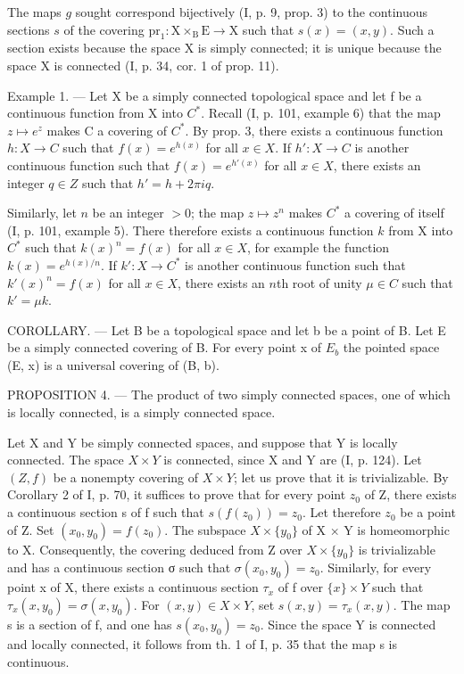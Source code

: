 The maps \(g\) sought correspond bijectively (I, p. 9, prop. 3) to the continuous sections \(s\) of the covering \(\mathrm{pr}_1: \mathrm{X} \times_{\mathrm{B}} \mathrm{E} \to \mathrm{X}\) such that \(s(x) = (x, y)\). Such a section exists because the space X is simply connected; it is unique because the space X is connected (I, p. 34, cor. 1 of prop. 11).

Example 1. --- Let X be a simply connected topological space and let f be a continuous function from X into \(C^{*}\). Recall (I, p. 101, example 6) that the map \(z \mapsto e^{z}\) makes C a covering of \(C^{*}\). By prop. 3, there exists a continuous function \(h: X \to C\) such that \(f(x) = e^{h(x)}\) for all \(x \in X\). If \(h': X \to C\) is another continuous function such that \(f(x) = e^{h'(x)}\) for all \(x \in X\), there exists an integer \(q \in Z\) such that \(h' = h + 2\pi iq\).

Similarly, let \(n\) be an integer \(>0\); the map \(z \mapsto z^{n}\) makes \(C^{*}\) a covering of itself (I, p. 101, example 5). There therefore exists a continuous function \(k\) from X into \(C^{*}\) such that \(k(x)^{n} = f(x)\) for all \(x \in X\), for example the function \(k(x) = e^{h(x)/n}\). If \(k' : X \to C^{*}\) is another continuous function such that \(k'(x)^{n} = f(x)\) for all \(x \in X\), there exists an \(n\)th root of unity \(\mu \in C\) such that \(k' = \mu k\).

COROLLARY. — Let B be a topological space and let b be a point of B. Let E be a simply connected covering of B. For every point x of \(E_{b}\) the pointed space (E, x) is a universal covering of (B, b).

PROPOSITION 4. --- The product of two simply connected spaces, one of which is locally connected, is a simply connected space.

Let X and Y be simply connected spaces, and suppose that Y is locally connected. The space \(X \times Y\) is connected, since X and Y are (I, p. 124). Let \((Z, f)\) be a nonempty covering of \(X \times Y\); let us prove that it is trivializable. By Corollary 2 of I, p. 70, it suffices to prove that for every point \(z_{0}\) of Z, there exists a continuous section s of f such that \(s(f(z_{0})) = z_{0}\). Let therefore \(z_{0}\) be a point of Z. Set \((x_{0}, y_{0}) = f(z_{0})\). The subspace \(X \times \{y_{0}\}\) of X × Y is homeomorphic to X. Consequently, the covering deduced from Z over \(X \times \{y_{0}\}\) is trivializable and has a continuous section σ such that \(\sigma(x_{0}, y_{0}) = z_{0}\). Similarly, for every point x of X, there exists a continuous section \(\tau_{x}\) of f over \(\{x\} \times Y\) such that \(\tau_{x}(x, y_{0}) = \sigma(x, y_{0})\). For \((x, y) \in X \times Y\), set \(s(x, y) = \tau_{x}(x, y)\). The map s is a section of f, and one has \(s(x_{0}, y_{0}) = z_{0}\). Since the space Y is connected and locally connected, it follows from th. 1 of I, p. 35 that the map s is continuous.

